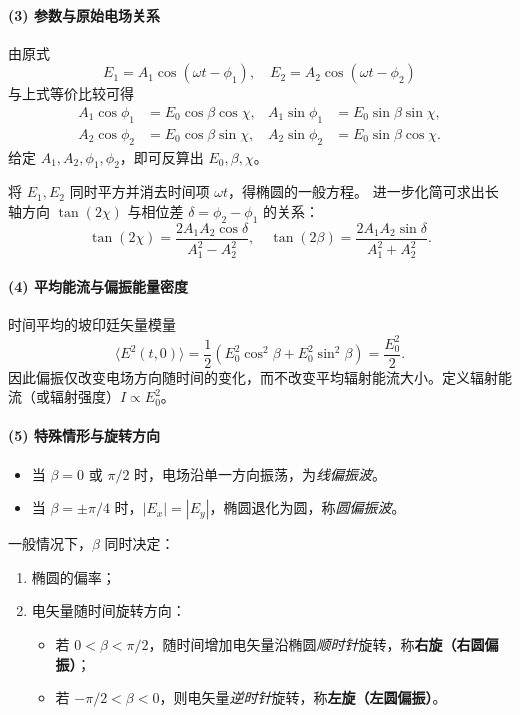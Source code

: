 \paragraph{(3) 参数与原始电场关系}
由原式
\[
E_1 = A_1\cos(\omega t-\phi_1), \quad E_2 = A_2\cos(\omega t-\phi_2)
\]
与上式等价比较可得
\begin{align*}
A_1\cos\phi_1 &= E_0\cos\beta\cos\chi, & A_1\sin\phi_1 &= E_0\sin\beta\sin\chi,\\
A_2\cos\phi_2 &= E_0\cos\beta\sin\chi, & A_2\sin\phi_2 &= E_0\sin\beta\cos\chi.
\end{align*}
给定 $A_1, A_2, \phi_1, \phi_2$，即可反算出 $E_0, \beta, \chi$。

\begin{derivationnote}[从两分量到椭圆参数的确定]
将 $E_1, E_2$ 同时平方并消去时间项 $\omega t$，得椭圆的一般方程。
进一步化简可求出长轴方向 $\tan(2\chi)$ 与相位差 $\delta=\phi_2-\phi_1$ 的关系：
\[
\tan(2\chi) = \frac{2A_1A_2\cos\delta}{A_1^2 - A_2^2},\quad
\tan(2\beta) = \frac{2A_1A_2\sin\delta}{A_1^2 + A_2^2}.
\]
\end{derivationnote}

\paragraph{(4) 平均能流与偏振能量密度}
时间平均的坡印廷矢量模量
\begin{equation}
\langle E^2(t,0)\rangle = \frac{1}{2}(E_0^2\cos^2\beta + E_0^2\sin^2\beta)
= \frac{E_0^2}{2}.
\end{equation}
因此偏振仅改变电场方向随时间的变化，而不改变平均辐射能流大小。定义辐射能流（或辐射强度）$I\propto E_0^2$。

\paragraph{(5) 特殊情形与旋转方向}
\begin{itemize}[leftmargin=2em]
  \item 当 $\beta=0$ 或 $\pi/2$ 时，电场沿单一方向振荡，为\emph{线偏振波}。
  \item 当 $\beta=\pm\pi/4$ 时，$|E_x|=|E_y|$，椭圆退化为圆，称\emph{圆偏振波}。
\end{itemize}

一般情况下，$\beta$ 同时决定：
\begin{enumerate}[leftmargin=2em]
  \item 椭圆的偏率；
  \item 电矢量随时间旋转方向：
  \begin{itemize}
    \item 若 $0<\beta<\pi/2$，随时间增加电矢量沿椭圆\emph{顺时针}旋转，称\textbf{右旋（右圆偏振）}；
    \item 若 $-\pi/2<\beta<0$，则电矢量\emph{逆时针}旋转，称\textbf{左旋（左圆偏振）}。
  \end{itemize}
\end{enumerate}

